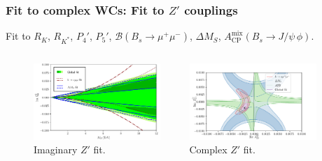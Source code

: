 \documentclass[mathserif, 10pt]{beamer}
\begin{document}
\begin{frame}\frametitle{Fit to complex WCs: Fit to $Z'$ couplings}
    Fit to $R_K$, $R_{K^*}$, $P_4'$, $P_5'$, $\mathcal{B}(B_s \to \mu^+ \mu^-)$, $\Delta M_S$, $A_\mathrm{CP}^\mathrm{mix}(B_s \to J/\psi\, \phi)$.

    \begin{figure}
        \begin{columns}
            \begin{column}{0.48\textwidth}
                \centering
                \includegraphics[width=0.9\textwidth]{figures/fitim_Z.pdf}
                \\ {\small Imaginary $Z'$ fit.}
            \end{column}
            \begin{column}{0.48\textwidth}
                \includegraphics[width=0.9\textwidth]{figures/fitcompl_Z.pdf}
                \\ {\small Complex $Z'$ fit.}


\end{column}
\end{columns}
\end{figure}
\end{frame}
\end{document}
